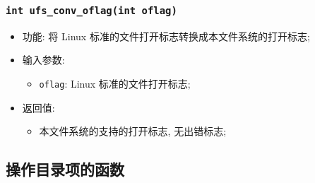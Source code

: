 \documentclass[nofonts, titlepage]{ctexart}
\begin{document}
  \subsubsection[\texttt{ufs\_conv\_oflag}]{\texttt{int ufs\_conv\_oflag(int oflag)}}
  \begin{itemize}
\item
  功能: 将 Linux 标准的文件打开标志转换成本文件系统的打开标志;
\item
  输入参数:

  \begin{itemize}
  \item
    \texttt{oflag}: Linux 标准的文件打开标志;
  \end{itemize}
\item
  返回值:

  \begin{itemize}
  \item
    本文件系统的支持的打开标志, 无出错标志;
  \end{itemize}
\end{itemize}

\subsection{操作目录项的函数}
\end{document}
